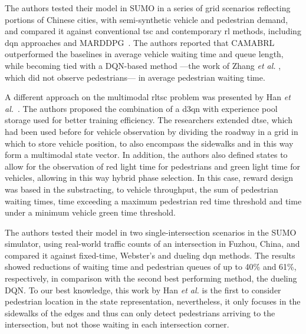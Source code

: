 The authors tested their model in SUMO in a series of grid scenarios reflecting portions of Chinese cities, with semi-synthetic vehicle and pedestrian demand, and compared it against conventional \gls{tsc} and contemporary \gls{rl} methods, including \gls{dqn} approaches and MARDDPG~\cite{Wu2020}. The authors reported that CAMABRL outperformed the baselines in average vehicle waiting time and queue length, while becoming tied with a DQN-based method —the work of Zhang \textit{et al.} \cite{Zhang2021b}, which did not observe pedestrians— in average pedestrian waiting time.

A different approach on the multimodal \gls{rltsc} problem was presented by Han \textit{et al.}~\cite{Han2022}. The authors proposed the combination of a \gls{d3qn} with experience pool storage used for better training efficiency. The researchers extended \gls{dtse}, which had been used before for vehicle observation by dividing the roadway in a grid in which to store vehicle position, to also encompass the sidewalks and in this way form a multimodal state vector. In addition, the authors also defined states to allow for the observation of red light time for pedestrians and green light time for vehicles, allowing in this way hybrid phase selection. In this case, reward design was based in the substracting, to vehicle throughput, the sum of pedestrian waiting times, time exceeding a maximum pedestrian red time threshold and time under a minimum vehicle green time threshold.

The authors tested their model in two single-intersection scenarios in the SUMO simulator, using real-world traffic counts of an intersection in Fuzhou, China, and compared it against fixed-time, Webster's and dueling \gls{dqn} methods. The results showed reductions of waiting time and pedestrian queues of up to 40\% and 61\%, respectively, in comparison with the second best performing method, the dueling DQN. To our best knowledge, this work by Han \textit{et al.} is the first to consider pedestrian location in the state representation, nevertheless, it only focuses in the sidewalks of the edges and thus can only detect pedestrians arriving to the intersection, but not those waiting in each intersection corner.

